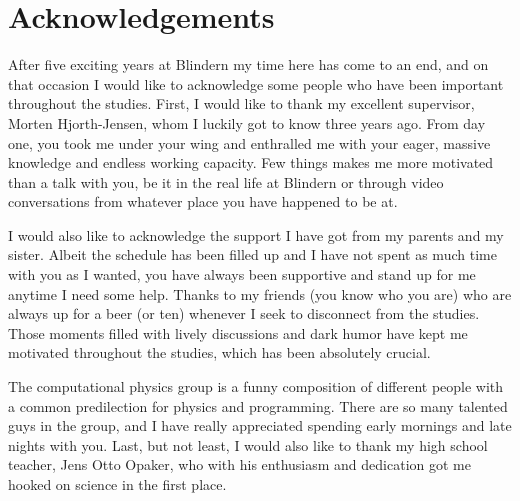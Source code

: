 \thispagestyle{empty}
\cleardoublepage

\section*{Acknowledgements}
After five exciting years at Blindern my time here has come to an end, and on that occasion I would like to acknowledge some people who have been important throughout the studies. First, I would like to thank my excellent supervisor, Morten Hjorth-Jensen, whom I luckily got to know three years ago. From day one, you took me under your wing and enthralled me with your eager, massive knowledge and endless working capacity. Few things makes me more motivated than a talk with you, be it in the real life at Blindern or through video conversations from whatever place you have happened to be at.

I would also like to acknowledge the support I have got from my parents and my sister. Albeit the schedule has been filled up and I have not spent as much time with you as I wanted, you have always been supportive and stand up for me anytime I need some help. Thanks to my friends (you know who you are) who are always up for a beer (or ten) whenever I seek to disconnect from the studies. Those moments filled with lively discussions and dark humor have kept me motivated throughout the studies, which has been absolutely crucial.

The computational physics group is a funny composition of different people with a common predilection for physics and programming. There are so many talented guys in the group, and I have really appreciated spending early mornings and late nights with you. Last, but not least, I would also like to thank my high school teacher, Jens Otto Opaker, who with his enthusiasm and dedication got me hooked on science in the first place.

    
\thispagestyle{empty}
\cleardoublepage

\newpage

{%
    \tableofcontents
    \thispagestyle{empty}
    \clearpage}%

\thispagestyle{empty}
\clearpage


